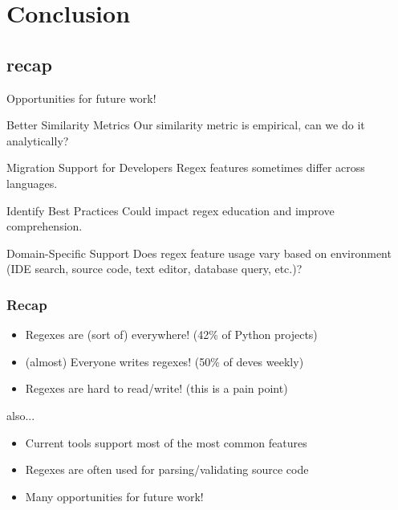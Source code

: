 \section{Conclusion}
\subsection{recap}


\begin{frame}{Opportunities for future work!}

\begin{block}{Better Similarity Metrics}
Our similarity metric is empirical, can we do it analytically?
\end{block}



\begin{block}{Migration Support for Developers}
Regex features sometimes differ across languages.
\end{block}


\begin{block}{Identify Best Practices}
Could impact regex education and improve comprehension.
\end{block}


\begin{block}{Domain-Specific Support}
Does regex feature usage vary based on environment (IDE search, source code, text editor, database query, etc.)?
\end{block}



\end{frame}

\begin{frame}
\frametitle{Recap}

\begin{itemize}
\item Regexes are (sort of) everywhere! (42\% of Python projects)
\item (almost) Everyone writes regexes! (50\% of deves weekly)
\item Regexes are hard to read/write! (this is a pain point)
\end{itemize}

also...

\begin{itemize}
\item Current tools support most of the most common features
\item Regexes are often used for parsing/validating source code 
\item Many opportunities for future work!
\end{itemize}


\end{frame}


